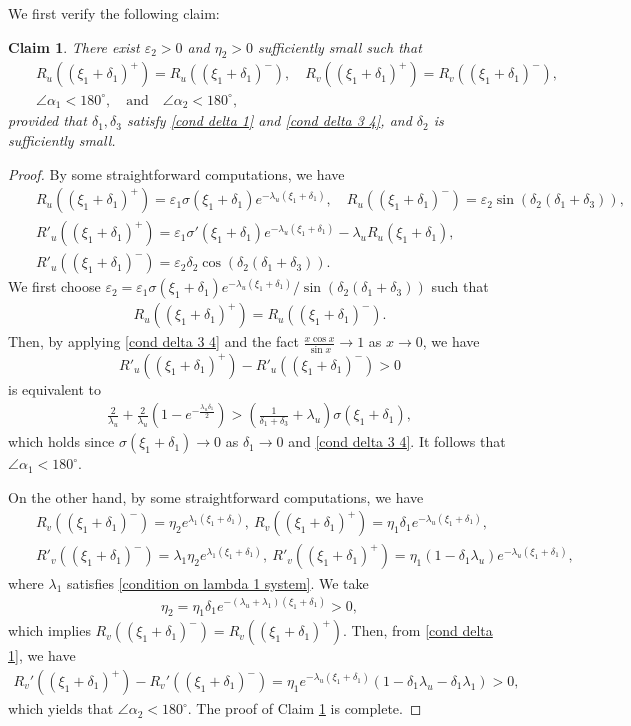 \documentclass[11pt,a4paper]{article}
\newtheorem{claim}[theorem]{\textbf{Claim}}
\numberwithin{equation}{section}
\numberwithin{figure}{section}
\newcommand\beaa{\begin{eqnarray*}}
\newcommand\eeaa{\end{eqnarray*}}
\begin{document}
We first verify the following claim: %
\begin{claim}\label{cl: alpha 1 aplha 2}
There exist %
$\varepsilon_2>0$ and $\eta_2>0$ sufficiently small
such that
\beaa
&&R_u((\xi_{1}+\delta_1)^+)=R_u((\xi_{1}+\delta_1)^-),\quad R_v((\xi_{1}+\delta_1)^+)=R_v((\xi_{1}+\delta_1)^-),\\ &&\angle\alpha_1<180^{\circ}, \quad\text{and}\quad \angle\alpha_2<180^{\circ},
\eeaa
provided that  $\delta_1,\delta_3$ satisfy \eqref{cond delta 1} and \eqref{cond delta 3 4},  and $\delta_2$ is sufficiently small.
\end{claim}
\begin{proof}
By some  straightforward computations, we have
\beaa
&&R_u((\xi_{1}+\delta_1)^+)=\varepsilon_1\sigma(\xi_1+\delta_1)e^{-\lambda_u(\xi_{1}+\delta_1)},\quad R_u((\xi_{1}+\delta_1)^-)=\varepsilon_2\sin(\delta_2(\delta_1+\delta_3)),\\
&&R'_u((\xi_{1}+\delta_1)^+)=\varepsilon_1\sigma'(\xi_1+\delta_1)e^{-\lambda_u(\xi_{1}+\delta_1)}-\lambda_uR_u(\xi_{1}+\delta_1),\\
&&R'_u((\xi_{1}+\delta_1)^-)=\varepsilon_2\delta_2\cos(\delta_2(\delta_1+\delta_3)).
\eeaa
We first choose %
$\varepsilon_2=\varepsilon_1\sigma(\xi_1+\delta_1)e^{-\lambda_u(\xi_{1}+\delta_1)}/\sin(\delta_2(\delta_1+\delta_3))$ such that
\beaa
R_u((\xi_{1}+\delta_1)^+)=R_u((\xi_{1}+\delta_1)^-).
\eeaa
Then, by applying \eqref{cond delta 3 4} and the fact $\frac{x\cos x}{\sin x}\to 1$ as $x\to 0$, we have 
$$R'_u((\xi_{1}+\delta_1)^+)-R'_u((\xi_{1}+\delta_1)^-)>0$$
 is equivalent to
\beaa
\frac{2}{\lambda_u}+\frac{2}{\lambda_u}(1-e^{-\frac{\lambda_u\delta_1}{2}})>(\frac{1}{\delta_1+\delta_3}+\lambda_u)\sigma(\xi_1+\delta_1),
\eeaa
which holds since $\sigma(\xi_1+\delta_1)\to 0$ as $\delta_1\to 0$ and \eqref{cond delta 3 4}. It follows that $\angle\alpha_1<180^{\circ}$.



On the other hand, by some  straightforward computations, we have
\beaa
&&R_v((\xi_{1}+\delta_1)^-)=\eta_2e^{\lambda_1(\xi_{1}+\delta_1)},\ R_v((\xi_{1}+\delta_1)^+)=\eta_1\delta_1e^{-\lambda_u(\xi_{1}+\delta_1)},\\
&&R'_v((\xi_{1}+\delta_1)^-)=\lambda_1\eta_2e^{\lambda_1(\xi_{1}+\delta_1)},\ R'_v((\xi_{1}+\delta_1)^+)=\eta_1(1-\delta_1\lambda_u)e^{-\lambda_u(\xi_{1}+\delta_1)},
\eeaa
where $\lambda_1$ satisfies \eqref{condition on lambda 1 system}.
We take
\beaa
\eta_2=\eta_1\delta_1e^{-(\lambda_u+\lambda_1)(\xi_{1}+\delta_1)}>0,
\eeaa
which implies $R_v((\xi_{1}+\delta_1)^-)=R_v((\xi_{1}+\delta_1)^+)$. Then, from \eqref{cond delta 1}, we have
\beaa
R_v'((\xi_{1}+\delta_1)^+)-R_v'((\xi_{1}+\delta_1)^-)=\eta_1e^{-\lambda_u(\xi_1+\delta_1)}(1-\delta_1\lambda_u-\delta_1\lambda_1)>0,
\eeaa
which yields that $\angle\alpha_2<180^{\circ}$.
The proof of Claim \ref{cl: alpha 1 aplha 2} is complete.
\end{proof}
\end{document}
